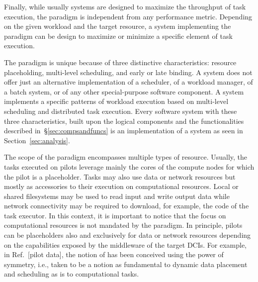 \documentclass{sig-alternate}
\begin{document}
Finally, while usually \pilot systems are designed to maximize the
throughput of task execution, the \pilot paradigm is independent from
any performance metric. Depending on the given workload and the target
resource, a \pilot system implementing the \pilot paradigm can be design
to maximize or minimize a specific element of task execution.

The \pilot paradigm is unique because of three distinctive
characteristics: resource placeholding, multi-level scheduling, and
early or late binding. A \pilot system does not offer just an
alternative implementation of a scheduler, of a workload manager, of a
batch system, or of any other special-purpose software component. A
\pilot system implements a specific patterns of workload execution based
on multi-level scheduling and distributed task execution. Every software
system with these three characteristics, built upon the logical
components and the functionalities described in~\S\ref{sec:compsandfuncs} is an
implementation of a \pilot system as seen in Section~\ref{sec:analysis}.




The scope of the \pilot paradigm encompasses multiple types of resource.
Usually, the tasks executed on pilots leverage mainly the cores of the
compute nodes for which the pilot is a placeholder. Tasks may also use
data or network resources but mostly as accessories to their execution
on computational resources. Local or shared filesystems may be used to
read input and write output data while network connectivity may be
required to download, for example, the code of the task executor. In
this context, it is important to notice that the focus on computational
resources is not mandated by the \pilot paradigm. In principle, pilots
can be placeholders also and exclusively for data or network resources
depending on the capabilities exposed by the middleware of the target
DCIs. For example, in Ref.~[pilot data], the notion of \pilotdata has
been conceived using the power of symmetry, i.e., \pilotdata taken to be
a notion as fundamental to dynamic data placement and scheduling as
\pilot is to computational tasks.
\end{document}
